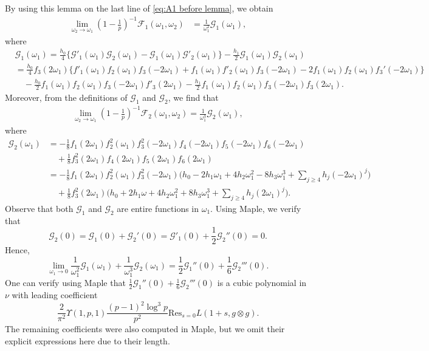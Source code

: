 \documentclass[12pt]{amsart}
\theoremstyle{plain}
\theoremstyle{definition}
\begin{document}
 
By using this lemma on the last line of \eqref{eq:A1 before lemma}, we obtain
    \begin{align*}
    \lim_{\omega_2\to\omega_1}\left(1-\frac{1}{p}\right)^{-1}\mathscr{F}_1(\omega_1,\omega_2)
    &=\frac{1}{\omega_1^2}\mathscr{G}_1(\omega_1),
    \end{align*}
where 
    \begin{align*}
    &\mathscr{G}_1(\omega_1)
    =\frac{h_0}{4}\Big\{\mathcal{G}'_1(\omega_1)\mathcal{G}_2(\omega_1)-\mathcal{G}_1(\omega_1)\mathcal{G}'_2(\omega_1)\Big\}
    -\frac{h_1}{2}\mathcal{G}_1(\omega_1)\mathcal{G}_2(\omega_1)
    \\&=\frac{h_0}{4}f_3(2\omega_1)
    \Big\{f'_1(\omega_1)f_2(\omega_1)f_3(-2\omega_1)+f_1(\omega_1)f'_2(\omega_1)f_{3}(-2\omega_1)-2f_1(\omega_1)f_2(\omega_1)f_{3}'(-2\omega_1)\Big\}
    \\&
    \hspace{1em}
    -\frac{h_0}{2}f_1(\omega_1)f_2(\omega_1)f_3(-2\omega_1)f'_3(2\omega_1)-\frac{h_1}{2}f_1(\omega_1)f_2(\omega_1)f_3(-2\omega_1)f_{3}(2\omega_1).
    \end{align*}
Moreover, from the definitions of $\mathcal{G}_1$ and $\mathcal{G}_2$, we find that
    \begin{align*}
    \lim_{\omega_2\to\omega_1}\left(1-\frac{1}{p}\right)^{-1}\mathscr{F}_2(\omega_1,\omega_2)
    =\frac{1}{\omega_1^3}\mathscr{G}_2(\omega_1),
    \end{align*}
where 
    \begin{align*}
    \mathscr{G}_2(\omega_1)
    &=-\frac{1}{8}f_1(2\omega_1)f^2_{2}(\omega_1)f^2_3(-2\omega_1)f_{4}(-2\omega_1)f_{5}(-2\omega_1)f_6(-2\omega_1)
    \\
    &\hspace{1em}+\frac{1}{8}f^2_{3}(2\omega_1)f_{4}(2\omega_1)f_5(2\omega_1)f_6(2\omega_1)\\
    &=-\frac{1}{8}f_1(2\omega_1)f^2_{2}(\omega_1)f^2_3(-2\omega_1)\bigg(h_0-2h_1 \omega_1+4h_2\omega_1^2-8h_3\omega_1^3+\sum_{j\geq4}h_j(-2\omega_1)^{j}\bigg)\\
    &\hspace{1em}+\frac{1}{8}f^2_{3}(2\omega_1)\Big(h_0+2h_1 \omega+4h_2\omega_1^2+8h_3\omega_1^3+\sum_{j\geq4}h_j(2\omega_1)^{j}\Big).
    \end{align*}
Observe that both $\mathscr{G}_1$ and $\mathscr{G}_2$ are entire functions in $\omega_1$. Using Maple, we verify that 
    \[
    \mathscr{G}_2(0)
    =\mathscr{G}_1(0)+\mathscr{G}_2'(0)
    =\mathscr{G}'_1(0)+\frac12\mathscr{G}_2''(0)=0.
    \] 
Hence,
    \[
    \lim_{\omega_1\to 0}\frac{1}{\omega_1^2}\mathscr{G}_1(\omega_1)
    +\frac{1}{\omega_1^3}\mathscr{G}_2(\omega_1)
    =\frac12\mathscr{G}_1''(0) +\frac16\mathscr{G}_2'''(0).
    \]
One can verify using Maple that $\frac12\mathscr{G}_1''(0)+\frac16\mathscr{G}_2'''(0)$ is a cubic polynomial in $\nu$ with leading coefficient
    \[
   \frac{2}{\pi^2} \Upsilon(1,p,1)\frac{(p-1)^2 \log^3{p}}{p^2}\mathrm{Res}_{s=0}L(1+s, g\otimes g).
    \]
The remaining coefficients were also computed in Maple, but we omit their explicit expressions here due to their length.
\end{document}
